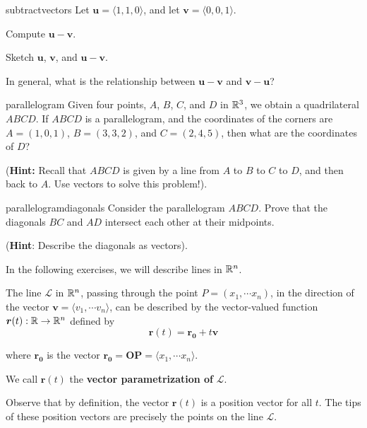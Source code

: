 \begin{problem}{subtractvectors}
    Let $\bm{u} = \langle 1, 1, 0 \rangle$, and let $\bm{v} = \langle 0, 0, 1 \rangle$. 
    
    \begin{subproblems}
    \item Compute $\bm{u-v}$.
    \item Sketch $\bm{u}$, $\bm{v}$, and $\bm{u-v}$.
    \item In general, what is the relationship between  $\bm{u-v}$ and  $\bm{v-u}$?
    \end{subproblems}
\end{problem}

\begin{problem}{parallelogram}
    Given four points, $A$, $B$, $C$, and $D$ in $\mathbb{R}^3$, we obtain a quadrilateral $ABCD$.  If $ABCD$ is a parallelogram, and the coordinates of the corners are $A = (1,0,1)$, $B = (3,3,2)$, and $C = (2,4, 5)$, then what are the coordinates of $D$?
    
    (\textbf{Hint:} Recall that $ABCD$ is given by a line from $A$ to $B$ to $C$ to $D$, and then back to $A$.  Use vectors to solve this problem!).
\end{problem}

\begin{problem}{parallelogramdiagonals}
    Consider the parallelogram $ABCD$.  Prove that the diagonals $BC$ and $AD$ intersect each other at their midpoints.
    
    (\textbf{Hint}: Describe the diagonals as vectors).
\end{problem}


In the following exercises, we will describe lines in $\mathbb{R}^n$.
    
    \begin{definition}\label{linesinrn}
    The line $\mathscr{L}$ in $\mathbb{R}^n$, passing through the point $P = (x_1, \cdots x_n)$, in the direction of the vector $\bm{v} = \langle v_1,  \cdots v_n \rangle$, can be described by the vector-valued function $\bm{r}(t) : \mathbb{R} \to \mathbb{R}^n$ defined by $$\bm{r}(t) = \bm{r_0} + t\bm{v}$$
    
    where $\bm{r_0}$ is the vector $\bm{r_0} = \bm{OP} = \langle x_1, \cdots x_n\rangle$.
    
    We call $\bm{r}(t)$ the \textbf{vector parametrization of} $\mathscr{L}$.
    
    \end{definition}

    Observe that by definition, the vector $\bm{r}(t)$ is a position vector for all $t$.  The tips of these position vectors are precisely the points on the line $\mathscr{L}$.

